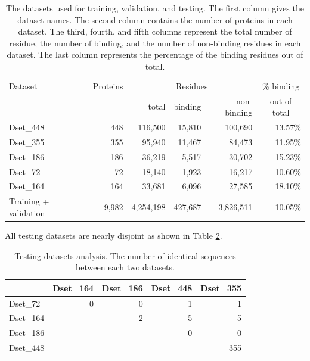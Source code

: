 \begin{table}[htbp]
    \centering
    \caption[The datasets used for training, validation, and testing]{The datasets used for training, validation, and testing. The first column gives the dataset names. The second column contains the number of proteins in each dataset. The third, fourth, and fifth columns represent the total number of residue, the number of binding, and the number of non-binding residues in each dataset. The last column represents the percentage of the binding residues out of total.}
    \begin{tabular}{p{12em}rrrrr}
    \toprule
    Dataset & Proteins & \multicolumn{3}{c}{Residues} & \multicolumn{1}{c}{\% binding} \\ \cline{3-5}
    & & total & binding & non-binding & \multicolumn{1}{c}{out of total}\\ \hline
    Dset\_448 & 448   & 116,500 & 15,810 & 100,690 & 13.57\% \\
    Dset\_355 & 355   & 95,940 & 11,467 & 84,473 & 11.95\% \\
    Dset\_186 & 186   & 36,219 & 5,517 & 30,702 & 15.23\% \\
    Dset\_72 & 72    & 18,140 & 1,923 & 16,217 & 10.60\% \\
    Dset\_164 & 164   & 33,681 & 6,096 & 27,585 & 18.10\% \\
    Training + validation & 9,982 & 4,254,198 & 427,687 & 3,826,511 & 10.05\% \\
    \hline
    \end{tabular}%
    \label{tab_dataset}%
\end{table}%

All testing datasets are nearly disjoint as shown in Table \ref{tab:addlabel}.
\begin{table}[htbp]
  \centering
  \caption[Testing datasets analysis]{Testing datasets analysis. The number of identical sequences between each two datasets.}
    \begin{tabular}{|p{4.215em}|r|r|r|r|}
    \toprule
    \multicolumn{1}{|r|}{} & \multicolumn{1}{p{4.215em}|}{Dset\_164} & \multicolumn{1}{p{4.215em}|}{Dset\_186} & \multicolumn{1}{p{4.215em}|}{Dset\_448} & \multicolumn{1}{p{4.215em}|}{Dset\_355} \\
    \midrule
    Dset\_72 & 0     & 0     & 1     & 1 \\
    \midrule
    Dset\_164 &       & 2     & 5     & 5 \\
    \midrule
    Dset\_186 &       &       & 0     & 0 \\
    \midrule
    Dset\_448 &       &       &       & 355 \\
    \bottomrule
    \end{tabular}%
  \label{tab:addlabel}%
\end{table}%
